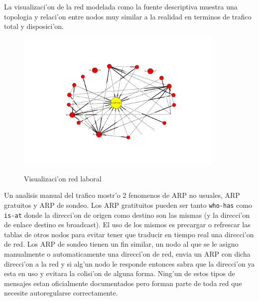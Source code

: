 La visualizaci'on de la red modelada como la fuente descriptiva muestra una topologia y relaci'on entre nodos muy similar
a la realidad en terminos de trafico total y disposici'on.

\begin{figure}[!h]
\centering
\caption{Visualizaci'on red laboral}
\includegraphics[width=0.9\textwidth]{red2_red}
 \label{fig:red2net}
\end{figure}

Un analisis manual del trafico mostr'o 2 fenomenos de ARP no usuales, ARP gratuitos y ARP de sondeo. Los ARP gratituitos pueden
ser tanto \texttt{who-has} como \texttt{is-at} donde la direcci'on de origen como destino son las mismas (y la direcci'on
de enlace destino es broadcast). El uso de los mismos es precargar o refrescar las tablas de otros nodos para evitar tener
que traducir en tiempo real una direcci'on de red. Los ARP de sondeo tienen un fin similar, un nodo al que se le asigno manualmente
o automaticamente una direcci'on de red, envia un ARP con dicha direcci'on a la red y si alg'un nodo le responde entonces sabra
que la direcci'on ya esta en uso y evitara la colisi'on de alguna forma. Ning'un de estos tipos de mensajes estan oficialmente
documentados pero forman parte de toda red que necesite autoregularse correctamente.\\
